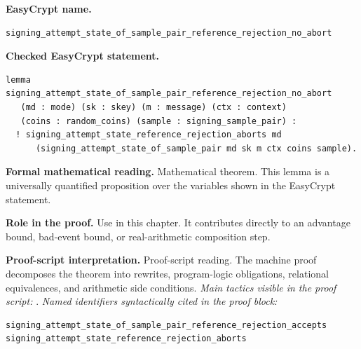 \begin{formaltheorem}
\noindent\textbf{EasyCrypt name.}
\begin{lstlisting}[language=EasyCrypt,basicstyle=\ttfamily\scriptsize]
signing_attempt_state_of_sample_pair_reference_rejection_no_abort
\end{lstlisting}
\noindent\textbf{Checked EasyCrypt statement.}
\begin{lstlisting}[language=EasyCrypt,basicstyle=\ttfamily\scriptsize]
lemma signing_attempt_state_of_sample_pair_reference_rejection_no_abort
   (md : mode) (sk : skey) (m : message) (ctx : context)
   (coins : random_coins) (sample : signing_sample_pair) :
  ! signing_attempt_state_reference_rejection_aborts md
      (signing_attempt_state_of_sample_pair md sk m ctx coins sample).
\end{lstlisting}
\noindent\textbf{Formal mathematical reading.}
Mathematical theorem. This lemma is a universally quantified proposition over the variables shown in the EasyCrypt statement.

\noindent\textbf{Role in the proof.}
Use in this chapter. It contributes directly to an advantage bound, bad-event bound, or real-arithmetic composition step.

\noindent\textbf{Proof-script interpretation.}
Proof-script reading. The machine proof decomposes the theorem into rewrites, program-logic obligations, relational equivalences, and arithmetic side conditions.
\emph{Main tactics visible in the proof script:} .
\emph{Named identifiers syntactically cited in the proof block:}
\begin{lstlisting}[language=EasyCrypt,basicstyle=\ttfamily\scriptsize]
signing_attempt_state_of_sample_pair_reference_rejection_accepts
signing_attempt_state_reference_rejection_aborts
\end{lstlisting}

\end{formaltheorem}

